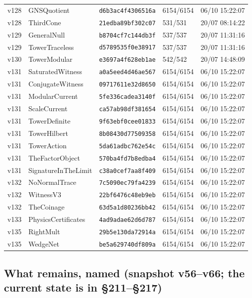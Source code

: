 \documentclass[11pt]{article}
\theoremstyle{definition}\newtheorem{deriv}{Derivation}
\begin{document}
{\begin{longtable}{@{}lllll@{}}
v128 & GNSQuotient & \texttt{d6b3ac4f4306516a} & 6154/6154 & 06/10 15:22:07 \\
v128 & ThirdCone & \texttt{21edba89bf302c07} & 531/531 & 20/07 08:14:22 \\
v129 & GeneralNull & \texttt{b8704cf7c144db3f} & 537/537 & 20/07 11:31:16 \\
v129 & TowerTraceless & \texttt{d5789535f0e38917} & 537/537 & 20/07 11:31:16 \\
v130 & TowerModular & \texttt{e3697a4f628eb1ae} & 542/542 & 20/07 14:48:09 \\
v131 & SaturatedWitness & \texttt{a0a5eed4d46ae567} & 6154/6154 & 06/10 15:22:07 \\
v131 & ConjugateWitness & \texttt{09717611e32d8650} & 6154/6154 & 06/10 15:22:07 \\
v131 & ModularCurrent & \texttt{5fe336cadea3140f} & 6154/6154 & 06/10 15:22:07 \\
v131 & ScaleCurrent & \texttt{ca57ab98df381654} & 6154/6154 & 06/10 15:22:07 \\
v131 & TowerDefinite & \texttt{9f63ebf0cee01833} & 6154/6154 & 06/10 15:22:07 \\
v131 & TowerHilbert & \texttt{8b08430d77509358} & 6154/6154 & 06/10 15:22:07 \\
v131 & TowerAction & \texttt{5da61adbc762e54c} & 6154/6154 & 06/10 15:22:07 \\
v131 & TheFactorObject & \texttt{570ba4fd7b8edba4} & 6154/6154 & 06/10 15:22:07 \\
v131 & SignatureInTheLimit & \texttt{c38a0cef7aa8f409} & 6154/6154 & 06/10 15:22:07 \\
v132 & NoNormalTrace & \texttt{7c5090ec79fa4239} & 6154/6154 & 06/10 15:22:07 \\
v132 & WitnessV3 & \texttt{22bf6476c48eb9eb} & 6154/6154 & 06/10 15:22:07 \\
v132 & TheCoinage & \texttt{63d5a1d80236bb42} & 6154/6154 & 06/10 15:22:07 \\
v133 & PhysicsCertificates & \texttt{4ad9adae62d6d787} & 6154/6154 & 06/10 15:22:07 \\
v135 & RightMult & \texttt{29b5e130da72914a} & 6154/6154 & 06/10 15:22:07 \\
v135 & WedgeNet & \texttt{be5a629740df809a} & 6154/6154 & 06/10 15:22:07 \\
\bottomrule\end{longtable}}

\subsection*{What remains, named (snapshot v56--v66; the current state is in \S211--\S217)}
\end{document}
